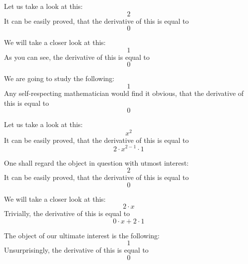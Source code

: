 \documentclass{article}
\begin{document}
Let us take a look at this:
\begin{equation}
2 
\end{equation}
It can be easily proved, that the derivative of this is equal to
\begin{equation}
0 
\end{equation}

We will take a closer look at this:
\begin{equation}
1 
\end{equation}
As you can see, the derivative of this is equal to
\begin{equation}
0 
\end{equation}

We are going to study the following:
\begin{equation}
1 
\end{equation}
Any self-respecting mathematician would find it obvious, that the derivative of this is equal to
\begin{equation}
0 
\end{equation}

Let us take a look at this:
\begin{equation}
x ^{2 } 
\end{equation}
It can be easily proved, that the derivative of this is equal to
\begin{equation}
2 \cdot x ^{2 - 1 } \cdot 1 
\end{equation}

One shall regard the object in question with utmost interest:
\begin{equation}
2 
\end{equation}
It can be easily proved, that the derivative of this is equal to
\begin{equation}
0 
\end{equation}

We will take a closer look at this:
\begin{equation}
2 \cdot x 
\end{equation}
Trivially, the derivative of this is equal to
\begin{equation}
0 \cdot x + 2 \cdot 1 
\end{equation}

The object of our ultimate interest is the following:
\begin{equation}
1 
\end{equation}
Unsurprisingly, the derivative of this is equal to
\begin{equation}
0 
\end{equation}
\end{document}
